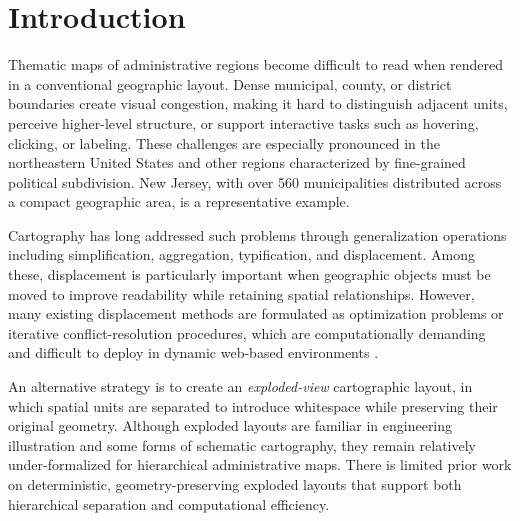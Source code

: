 \documentclass[12pt, a4paper]{article}
\numberwithin{equation}{section}
\begin{document}
\begin{abstract}
Because the closed-form displacement step operates through direct vector translation without iterative optimization or topology reconstruction, it is $O(n)$ in feature count, excluding geometry preprocessing, CRS transformation, union/centroid operations, and optional refinement. The method is therefore suitable for dynamic mapping environments such as interactive web applications and statistical dashboards. The accompanying \textsf{R} implementation and map gallery provide reproducible scripts, static outputs, and documented display offsets separating analytical validation from cartographic finishing.
\end{abstract}

\newpage
\tableofcontents
\newpage

\section{Introduction}

Thematic maps of administrative regions become difficult to read when rendered in a conventional geographic layout. Dense municipal, county, or district boundaries create visual congestion, making it hard to distinguish adjacent units, perceive higher-level structure, or support interactive tasks such as hovering, clicking, or labeling. These challenges are especially pronounced in the northeastern United States and other regions characterized by fine-grained political subdivision. New Jersey, with over 560 municipalities distributed across a compact geographic area, is a representative example.

Cartography has long addressed such problems through generalization operations including simplification, aggregation, typification, and displacement. Among these, displacement is particularly important when geographic objects must be moved to improve readability while retaining spatial relationships. However, many existing displacement methods are formulated as optimization problems or iterative conflict-resolution procedures, which are computationally demanding and difficult to deploy in dynamic web-based environments \citep{bader2001, harrie2002}.

An alternative strategy is to create an \emph{exploded-view} cartographic layout, in which spatial units are separated to introduce whitespace while preserving their original geometry. Although exploded layouts are familiar in engineering illustration and some forms of schematic cartography, they remain relatively under-formalized for hierarchical administrative maps. There is limited prior work on deterministic, geometry-preserving exploded layouts that support both hierarchical separation and computational efficiency.
\end{document}
